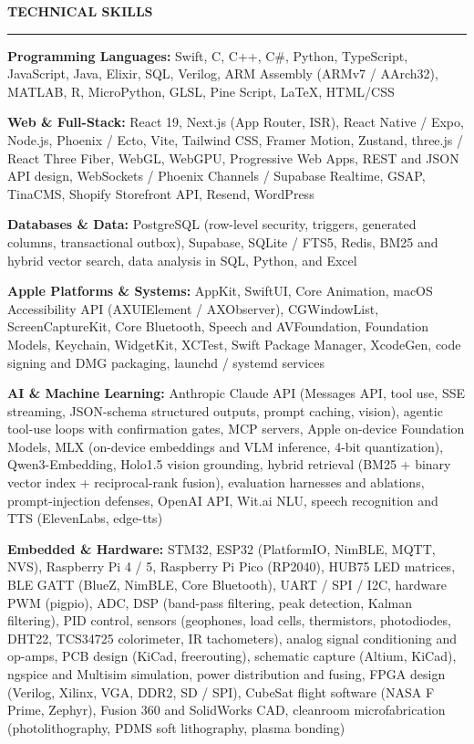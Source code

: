 \documentclass[letterpaper,10pt]{article}
\newcommand{\SectionGapBefore}{12pt}
\newcommand{\SectionGapAfter}{4pt}
\newcommand{\sectiontitle}[1]{%
  \Needspace*{5\baselineskip}%
  \vspace{\SectionGapBefore}%
  {\textbf{\large #1}}\par
  \vspace{-6pt}%
  \rule{\textwidth}{0.4pt}\par
  \vspace{\SectionGapAfter}%
}
\newcommand{\skillrow}[2]{\textbf{#1:} #2\par\vspace{2pt}}
\begin{document}
\sectiontitle{TECHNICAL SKILLS}
\skillrow{Programming Languages}{Swift, C, C++, C\#, Python, TypeScript, JavaScript, Java, Elixir, SQL, Verilog, ARM Assembly (ARMv7 / AArch32), MATLAB, R, MicroPython, GLSL, Pine Script, LaTeX, HTML/CSS}
\skillrow{Web \& Full-Stack}{React 19, Next.js (App Router, ISR), React Native / Expo, Node.js, Phoenix / Ecto, Vite, Tailwind CSS, Framer Motion, Zustand, three.js / React Three Fiber, WebGL, WebGPU, Progressive Web Apps, REST and JSON API design, WebSockets / Phoenix Channels / Supabase Realtime, GSAP, TinaCMS, Shopify Storefront API, Resend, WordPress}
\skillrow{Databases \& Data}{PostgreSQL (row-level security, triggers, generated columns, transactional outbox), Supabase, SQLite / FTS5, Redis, BM25 and hybrid vector search, data analysis in SQL, Python, and Excel}
\skillrow{Apple Platforms \& Systems}{AppKit, SwiftUI, Core Animation, macOS Accessibility API (AXUIElement / AXObserver), CGWindowList, ScreenCaptureKit, Core Bluetooth, Speech and AVFoundation, Foundation Models, Keychain, WidgetKit, XCTest, Swift Package Manager, XcodeGen, code signing and DMG packaging, launchd / systemd services}
\skillrow{AI \& Machine Learning}{Anthropic Claude API (Messages API, tool use, SSE streaming, JSON-schema structured outputs, prompt caching, vision), agentic tool-use loops with confirmation gates, MCP servers, Apple on-device Foundation Models, MLX (on-device embeddings and VLM inference, 4-bit quantization), Qwen3-Embedding, Holo1.5 vision grounding, hybrid retrieval (BM25 + binary vector index + reciprocal-rank fusion), evaluation harnesses and ablations, prompt-injection defenses, OpenAI API, Wit.ai NLU, speech recognition and TTS (ElevenLabs, edge-tts)}
\skillrow{Embedded \& Hardware}{STM32, ESP32 (PlatformIO, NimBLE, MQTT, NVS), Raspberry Pi 4 / 5, Raspberry Pi Pico (RP2040), HUB75 LED matrices, BLE GATT (BlueZ, NimBLE, Core Bluetooth), UART / SPI / I2C, hardware PWM (pigpio), ADC, DSP (band-pass filtering, peak detection, Kalman filtering), PID control, sensors (geophones, load cells, thermistors, photodiodes, DHT22, TCS34725 colorimeter, IR tachometers), analog signal conditioning and op-amps, PCB design (KiCad, freerouting), schematic capture (Altium, KiCad), ngspice and Multisim simulation, power distribution and fusing, FPGA design (Verilog, Xilinx, VGA, DDR2, SD / SPI), CubeSat flight software (NASA F Prime, Zephyr), Fusion 360 and SolidWorks CAD, cleanroom microfabrication (photolithography, PDMS soft lithography, plasma bonding)}
\end{document}
